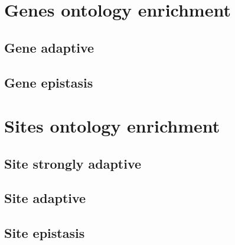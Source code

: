 \documentclass{article}
\begin{document}
\tiny



\section{Genes ontology enrichment}

\subsection{Gene adaptive}


\subsection{Gene epistasis}


\section{Sites ontology enrichment}

\subsection{Site strongly adaptive}


\subsection{Site adaptive}


\subsection{Site epistasis}

\end{document}
